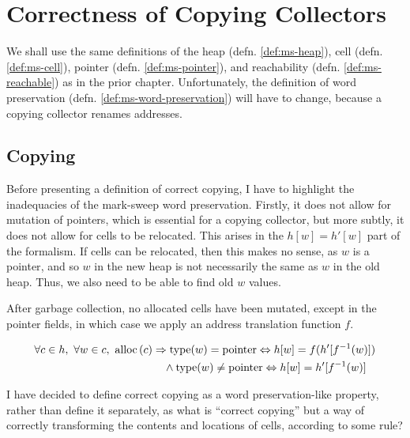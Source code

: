 \chapter{Correctness of Copying Collectors}
\label{sec:copying}

We shall use the same definitions of the \gls{heap}
(defn. \ref{def:ms-heap}), \gls{cell} (defn. \ref{def:ms-cell}),
\gls{pointer} (defn. \ref{def:ms-pointer}), and reachability
(defn. \ref{def:ms-reachable}) as in the prior chapter. Unfortunately,
the definition of word preservation
(defn. \ref{def:ms-word-preservation}) will have to change, because a
\gls{copying} \gls{collector} renames addresses.

\section{Copying}
\label{sec:copying-copying}

Before presenting a definition of correct copying, I have to highlight
the inadequacies of the \gls{mark-sweep} word preservation. Firstly,
it does not allow for mutation of \glspl{pointer}, which is essential
for a \gls{copying} \gls{collector}, but more subtly, it does not
allow for \glspl{cell} to be relocated. This arises in the $h[w] =
h'[w]$ part of the formalism. If \glspl{cell} can be relocated, then
this makes no sense, as $w$ is a \gls{pointer}, and so $w$ in the new
\gls{heap} is not necessarily the same as $w$ in the old
\gls{heap}. Thus, we also need to be able to find old $w$ values.

\begin{definition}
  \label{def:c-correct-copying}
  After garbage collection, no allocated cells have been mutated,
  except in the pointer fields, in which case we apply an address
  translation function $f$.

  \begin{align*}
    \forall c \in h,\ \forall w \in c,\ \mathrm{alloc}\left(c\right) & \Rightarrow
    \mathrm{type}(w) = \mathrm{pointer} \Leftrightarrow h[w] = f(h'[f^{-1}(w)])\\
    &\quad\land \mathrm{type}(w) \neq \mathrm{pointer} \Leftrightarrow h[w] =
    h'[f^{-1}(w)]
  \end{align*}
\end{definition}

I have decided to define correct copying as a word preservation-like
property, rather than define it separately, as what is ``correct
copying'' but a way of correctly transforming the contents and
locations of \glspl{cell}, according to some rule?

